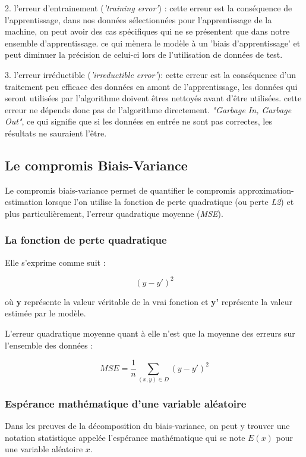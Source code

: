 \documentclass[a4paper]{article}
\begin{document}
2. l'erreur d'entrainement (\textit{'training error'}) : cette erreur est la conséquence de l'apprentissage, dans nos données sélectionnées pour l'apprentissage de la machine, on peut avoir des cas spécifiques qui ne se présentent que dans notre ensemble d'apprentissage. ce qui mènera le modèle à un 'biais d'apprentissage' et peut diminuer la précision de celui-ci lors de l'utilisation de données de test.\newline

3. l'erreur irréductible (\textit{'irreductible error'}): cette erreur est la conséquence d'un traitement peu efficace des données en amont de l'apprentissage, les données qui seront utilisées par l'algorithme doivent êtres nettoyés avant d'être utilisées. cette erreur ne dépends donc pas de l'algorithme directement.\newline
 \textit{"Garbage In, Garbage Out"}, ce qui signifie que si les données en entrée ne sont pas correctes, les résultats ne sauraient l'être. \newline

\newpage

\subsection{Le compromis Biais-Variance}

Le compromis biais-variance permet de quantifier le compromis approximation-estimation lorsque l'on utilise la fonction de perte quadratique (ou perte \textit{L2}) et plus particulièrement, l'erreur quadratique moyenne (\textit{MSE}).

\subsubsection{La fonction de perte quadratique}
Elle s'exprime comme suit :

\[ (y - y')^2 \]

où \textbf{y} représente la valeur véritable de la vrai fonction et \textbf{y'} représente la valeur estimée par le modèle. \newline

L'erreur quadratique moyenne quant à elle n'est que la moyenne des erreurs sur l'ensemble des données :

\[ MSE = \frac{1}{n} \sum_{(x,y)\in D} (y - y')^2 \]

\subsubsection{Espérance mathématique d'une variable aléatoire}
Dans les preuves de la décomposition du biais-variance, on peut y trouver une notation statistique appelée l'espérance mathématique qui se note $ E(x) $ pour une variable aléatoire $x$. \newline
\end{document}
